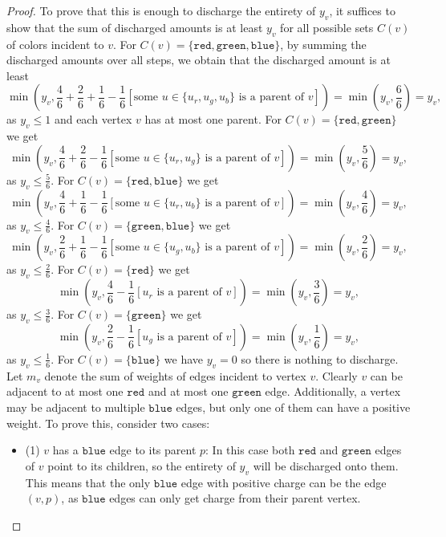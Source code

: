 \documentclass[a4paper,USenglish,cleveref,autoref,thm-restate,pdfa]{lipics-v2021}
\let\leq\leqslant
\newcommand{\cred}{\texttt{red}}
\newcommand{\cblue}{\texttt{blue}}
\newcommand{\cgreen}{\texttt{green}}
\begin{document}
\begin{proof}
  To prove that this is enough to discharge the entirety of $y_v$, it suffices to show that the sum of discharged amounts is at least $y_v$ for all possible sets $C(v)$ of colors incident to $v$. 
  For $C(v) = \{\cred, \cgreen, \cblue\}$, by summing the discharged amounts over all steps, we obtain that the discharged amount is at least
  \begin{equation*}
     \min\left(y_v, \frac{4}{6} + \frac{2}{6} + \frac{1}{6} - \frac{1}{6}[\text{some } u \in \{u_r, u_g, u_b\} \text{ is a parent of } v] \right)=
     \min\left(y_v, \frac{6}{6}\right) = y_v,
  \end{equation*}
  as $y_v \leq 1$ and each vertex $v$ has at most one parent.
  For $C(v)=\{ \cred, \cgreen \}$ we get
  \begin{equation*}
     \min\left(y_v, \frac{4}{6} + \frac{2}{6} - \frac{1}{6}[\text{some } u \in \{u_r, u_g\} \text{ is a parent of } v] \right)=
     \min\left(y_v, \frac{5}{6}\right) = y_v,
  \end{equation*}
  as $y_v \leq \frac{5}{6}$. For $C(v)=\{ \cred, \cblue \}$ we get
  \begin{equation*}
     \min\left(y_v, \frac{4}{6} + \frac{1}{6} - \frac{1}{6}[\text{some } u \in \{u_r, u_b\} \text{ is a parent of } v] \right)=
     \min\left(y_v, \frac{4}{6}\right) = y_v,
  \end{equation*}
  as $y_v \leq \frac{4}{6}$. For $C(v)=\{ \cgreen, \cblue \}$ we get
  \begin{equation*}
     \min\left(y_v, \frac{2}{6} + \frac{1}{6} - \frac{1}{6}[\text{some } u \in \{u_g, u_b\} \text{ is a parent of } v] \right)=
     \min\left(y_v, \frac{2}{6}\right) = y_v,
  \end{equation*}
  as $y_v \leq \frac{2}{6}$.   For $C(v)=\{ \cred \}$ we get
  \begin{equation*}
     \min\left(y_v, \frac{4}{6} - \frac{1}{6}[u_r \text{ is a parent of } v] \right)=
     \min\left(y_v, \frac{3}{6}\right) = y_v,
  \end{equation*}
  as $y_v \leq \frac{3}{6}$. For $C(v)=\{ \cgreen \}$ we get
  \begin{equation*}
     \min\left(y_v, \frac{2}{6} - \frac{1}{6}[ u_g \text{ is a parent of } v] \right)=
     \min\left(y_v, \frac{1}{6}\right) = y_v,
  \end{equation*}
  as $y_v \leq \frac{1}{6}$. For $C(v)=\{ \cblue \}$ we have
$y_v =0$ so there is nothing to discharge.
  Let $m_v$ denote the sum of weights of edges incident to vertex $v$.
  Clearly $v$ can be adjacent to at most one $\cred$ and at most one $\cgreen$ edge.
Additionally, a vertex may be adjacent to multiple $\cblue$ edges, but only one of them can have a positive weight. 
To prove this, consider two cases:
    \begin{itemize} 
      \item (1) $v$ has a $\cblue$ edge to its parent $p$: In this case both $\cred$ and $\cgreen$ edges of $v$ point to its children, so the entirety of $y_v$ will be discharged onto them. This means that the only $\cblue$ edge with positive charge can be the edge $(v, p)$, as $\cblue$ edges can only get charge from their parent vertex. 


\end{itemize}
\end{proof}
\end{document}
